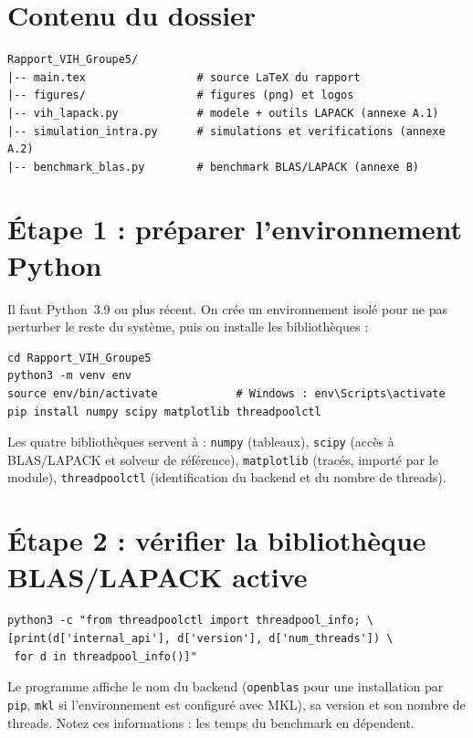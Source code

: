 \documentclass[11pt,a4paper]{report}
\theoremstyle{plain}
\theoremstyle{definition}
\theoremstyle{remark}
\begin{document}
\section{Contenu du dossier}

\begin{lstlisting}[language={}]
Rapport_VIH_Groupe5/
|-- main.tex                 # source LaTeX du rapport
|-- figures/                 # figures (png) et logos
|-- vih_lapack.py            # modele + outils LAPACK (annexe A.1)
|-- simulation_intra.py      # simulations et verifications (annexe A.2)
|-- benchmark_blas.py        # benchmark BLAS/LAPACK (annexe B)
\end{lstlisting}

\section{Étape 1 : préparer l'environnement Python}

Il faut Python~3.9 ou plus récent. On crée un environnement isolé pour ne pas perturber le reste du système, puis on installe les bibliothèques :

\begin{lstlisting}[language={}]
cd Rapport_VIH_Groupe5
python3 -m venv env
source env/bin/activate            # Windows : env\Scripts\activate
pip install numpy scipy matplotlib threadpoolctl
\end{lstlisting}

\noindent Les quatre bibliothèques servent à : \texttt{numpy} (tableaux), \texttt{scipy} (accès à BLAS/LAPACK et solveur de référence), \texttt{matplotlib} (tracés, importé par le module), \texttt{threadpoolctl} (identification du backend et du nombre de threads).

\section{Étape 2 : vérifier la bibliothèque BLAS/LAPACK active}

\begin{lstlisting}[language={}]
python3 -c "from threadpoolctl import threadpool_info; \
[print(d['internal_api'], d['version'], d['num_threads']) \
 for d in threadpool_info()]"
\end{lstlisting}

\noindent Le programme affiche le nom du backend (\texttt{openblas} pour une installation par \texttt{pip}, \texttt{mkl} si l'environnement est configuré avec MKL), sa version et son nombre de threads. Notez ces informations : les temps du benchmark en dépendent.
\end{document}
